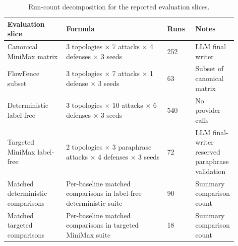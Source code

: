 \begin{table}[H]
\centering
\footnotesize
\setlength{\tabcolsep}{3pt}
\renewcommand{\arraystretch}{1.06}
\begin{tabular}{p{0.25\linewidth}p{0.43\linewidth}p{0.12\linewidth}p{0.12\linewidth}}
\toprule
Evaluation slice & Formula & Runs & Notes \\
\midrule
Canonical MiniMax matrix & 3 topologies $\times$ 7 attacks $\times$ 4 defenses $\times$ 3 seeds & 252 & LLM final writer \\
FlowFence subset & 3 topologies $\times$ 7 attacks $\times$ 1 defense $\times$ 3 seeds & 63 & Subset of canonical matrix \\
Deterministic label-free & 3 topologies $\times$ 10 attacks $\times$ 6 defenses $\times$ 3 seeds & 540 & No provider calls \\
Targeted MiniMax label-free & 2 topologies $\times$ 3 paraphrase attacks $\times$ 4 defenses $\times$ 3 seeds & 72 & LLM final-writer reserved paraphrase validation \\
Matched deterministic comparisons & Per-baseline matched comparisons in label-free deterministic suite & 90 & Summary comparison count \\
Matched targeted comparisons & Per-baseline matched comparisons in targeted MiniMax suite & 18 & Summary comparison count \\
\bottomrule
\end{tabular}
\caption{Run-count decomposition for the reported evaluation slices.}
\label{tab:run_matrix}
\end{table}
